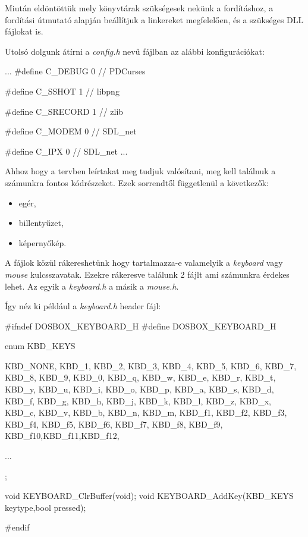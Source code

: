 Miután eldöntöttük mely könyvtárak szükségesek nekünk a fordításhoz, a fordítási útmutató alapján beállítjuk a linkereket megfelelően, és a szükséges DLL fájlokat is. 

Utolsó dolgunk átírni a \textit{config.h} nevű fájlban az alábbi konfigurációkat: 

\begin{cpp}

    ...
    #define C_DEBUG 0 // PDCurses

    #define C_SSHOT 1 // libpng

    #define C_SRECORD 1 // zlib

    #define C_MODEM 0 // SDL_net 

    #define C_IPX 0 // SDL_net 
    ...
\end{cpp}


Ahhoz hogy a tervben leírtakat meg tudjuk valósítani, meg kell találnuk a számunkra fontos kódrészeket. Ezek sorrendtől függetlenül a következők:
\begin{itemize}
    \item egér,
    \item billentyűzet,
    \item képernyőkép.
\end{itemize}

A fájlok közül rákereshetünk hogy tartalmazza-e valamelyik a \textit{keyboard} vagy \textit{mouse} kulcsszavatak. Ezekre rákeresve találunk 2 fájlt ami számunkra érdekes lehet. Az egyik a \textit{keyboard.h} a másik a \textit{mouse.h}.

Így néz ki például a \textit{keyboard.h} header fájl:

\begin{cpp}
    #ifndef DOSBOX_KEYBOARD_H
    #define DOSBOX_KEYBOARD_H
    
    enum KBD_KEYS {
        KBD_NONE,
        KBD_1,	KBD_2,	KBD_3,	KBD_4,	KBD_5,	KBD_6,	KBD_7,	
        KBD_8,	KBD_9,	KBD_0,		
        KBD_q,	KBD_w,	KBD_e,	KBD_r,	KBD_t,	KBD_y,	KBD_u,	
        KBD_i,	KBD_o,	KBD_p,	
        KBD_a,	KBD_s,	KBD_d,	KBD_f,	KBD_g,	KBD_h,	KBD_j,	
        KBD_k,	KBD_l,	KBD_z,
        KBD_x,	KBD_c,	KBD_v,	KBD_b,	KBD_n,	KBD_m,	
        KBD_f1,	KBD_f2,	KBD_f3,	KBD_f4,	KBD_f5,	KBD_f6,	KBD_f7,	
        KBD_f8,	KBD_f9,	KBD_f10,KBD_f11,KBD_f12,

        ...
        
    };
    
    void KEYBOARD_ClrBuffer(void);
    void KEYBOARD_AddKey(KBD_KEYS keytype,bool pressed);
    
    #endif
\end{cpp}

